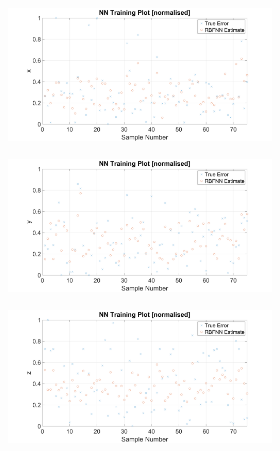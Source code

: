 \begin{figure}
  \begin{subfigure}{0.48\textwidth}
    \begin{subfigure}{\textwidth}
      \includegraphics[clip, trim = 100 0 100 0, width=\textwidth]{figures/chapter4/scatter_tr_x}
    \end{subfigure}
    \begin{subfigure}{\textwidth}
      \includegraphics[clip, trim = 100 0 100 0, width=\textwidth]{figures/chapter4/scatter_tr_y}
    \end{subfigure}
    \begin{subfigure}{\textwidth}
      \includegraphics[clip, trim = 100 0 100 0, width=\textwidth]{figures/chapter4/scatter_tr_z}

\end{subfigure}
\end{subfigure}
\end{figure}
